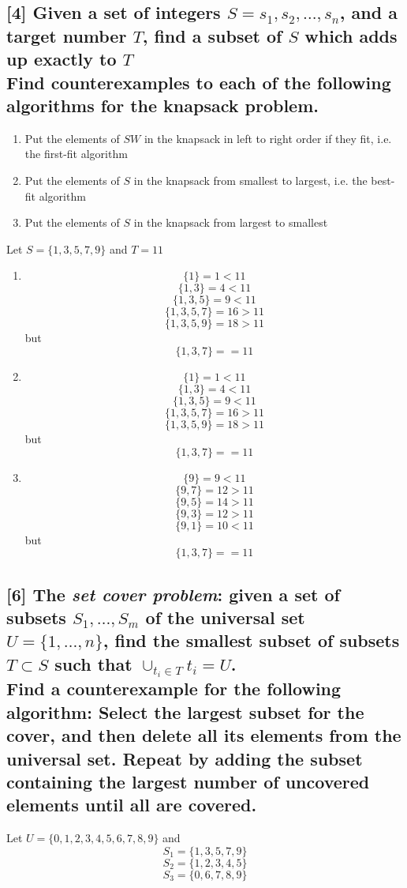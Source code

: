 \documentclass[12pt, letterpaper]{article}
\begin{document}
\subsection{[4] Given a set of integers $S = {s_1,s_2,\dots,s_n}$, and a target number $T$, find a subset of $S$ which adds up exactly to $T$\\Find counterexamples to each of the following algorithms for the knapsack problem.}
    \begin{enumerate}[label=\alph*)]
        \item{Put the elements of $SW$ in the knapsack in left to right order if they fit, i.e. the first-fit algorithm}
        \item{Put the elements of $S$ in the knapsack from smallest to largest, i.e. the best-fit algorithm}
        \item{Put the elements of $S$ in the knapsack from largest to smallest}
    \end{enumerate}
    Let $S = \{1,3,5,7,9\}$ and $T = 11$
    \begin{enumerate}[label=\alph*)]
        \item{
            \[\{1\}=1<11\]
            \[\{1,3\}=4<11\]
            \[\{1,3,5\}=9<11\]
            \[\{1,3,5,7\}=16>11\]
            \[\{1,3,5,9\}=18>11\]
            but \[\{1,3,7\} == 11\]
        }
        \item{
            \[\{1\}=1<11\]
            \[\{1,3\}=4<11\]
            \[\{1,3,5\}=9<11\]
            \[\{1,3,5,7\}=16>11\]
            \[\{1,3,5,9\}=18>11\]
            but \[\{1,3,7\} == 11\]
        }
        \item{
            \[\{9\}=9<11\]
            \[\{9,7\}=12>11\]
            \[\{9,5\}=14>11\]
            \[\{9,3\}=12>11\]
            \[\{9,1\}=10<11\]
            but \[\{1,3,7\} == 11\]
        }
    \end{enumerate}
\subsection{[6] The \emph{set cover problem}: given a set of subsets $S_1,\dots,S_m$ of the universal set $U = \{1,\dots,n\}$, find the smallest subset of subsets $T \subset S$ such that $\cup_{t_i \in T} t_i = U$.\\Find a counterexample for the following algorithm: Select the largest subset for the cover, and then delete all its elements from the universal set. Repeat by adding the subset containing the largest number of uncovered elements until all are covered.}
    Let $U = \{0,1,2,3,4,5,6,7,8,9\}$ and 
    \[S_1 = \{1,3,5,7,9\}\]
    \[S_2 = \{1,2,3,4,5\}\]
    \[S_3 = \{0,6,7,8,9\}\]
\end{document}
